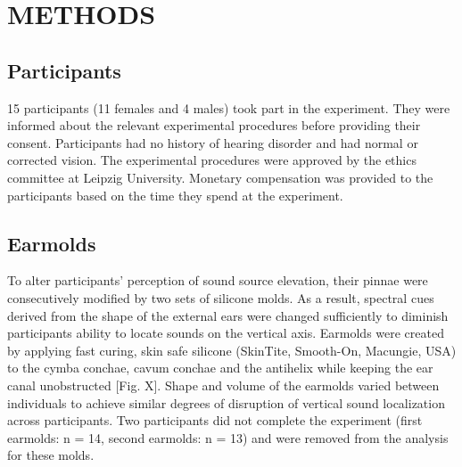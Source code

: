 \section{METHODS}\label{sec2}%
\subsection{Participants}
15 participants (11 females and 4 males) took part in the experiment.
They were informed about the relevant experimental procedures before providing their consent. Participants had no history of hearing disorder and had normal or corrected vision. The experimental procedures were approved by the ethics committee at Leipzig University. Monetary compensation was provided to the participants based on the time they spend at the experiment.

\subsection{Earmolds}
To alter participants’ perception of sound source elevation, their pinnae were consecutively modified by two sets of silicone molds. As a result, spectral cues derived from the shape of the external ears were changed sufficiently to diminish participants ability to locate sounds on the vertical axis. Earmolds were created by applying fast curing, skin safe silicone (SkinTite, Smooth-On, Macungie, USA) to the cymba conchae, cavum conchae and the antihelix while keeping the ear canal unobstructed [Fig. X]. Shape and volume of the earmolds varied between individuals to achieve similar degrees of disruption of vertical sound localization across participants. Two participants did not complete the experiment (first earmolds: n = 14, second earmolds: n = 13) and were removed from the analysis for these molds. 

